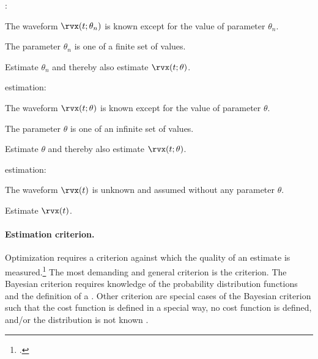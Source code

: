\begin{enume}
   \item {}:
      \begin{liste}
         \item The waveform $\rvx(t;\theta_n)$ is known except for the value of parameter $\theta_n$.
         \item The parameter $\theta_n$ is one of a finite set of values.
         \item Estimate $\theta_n$ and thereby also estimate $\rvx(t;\theta)$.
      \end{liste}
   \item {} estimation:
      \begin{liste}
         \item The waveform $\rvx(t;\theta)$ is known except for the value of parameter $\theta$.
         \item The parameter $\theta$ is one of an infinite set of values.
         \item Estimate $\theta$ and thereby also estimate $\rvx(t;\theta)$.
      \end{liste}
   \item {} estimation:
      \begin{liste}
         \item The waveform $\rvx(t)$ is unknown and assumed without any parameter $\theta$.
         \item Estimate $\rvx(t)$.
      \end{liste}
\end{enume}

\paragraph{Estimation criterion.}
Optimization requires a criterion against which the quality of an
estimate is measured.\footnote{.}
The most demanding and general criterion is the  criterion.
The Bayesian criterion requires knowledge of the probability
distribution functions and the definition of a .
Other criterion are special cases of the Bayesian criterion
such that the cost function is defined in a special way,
no cost function is defined, and/or the distribution is not known
.

